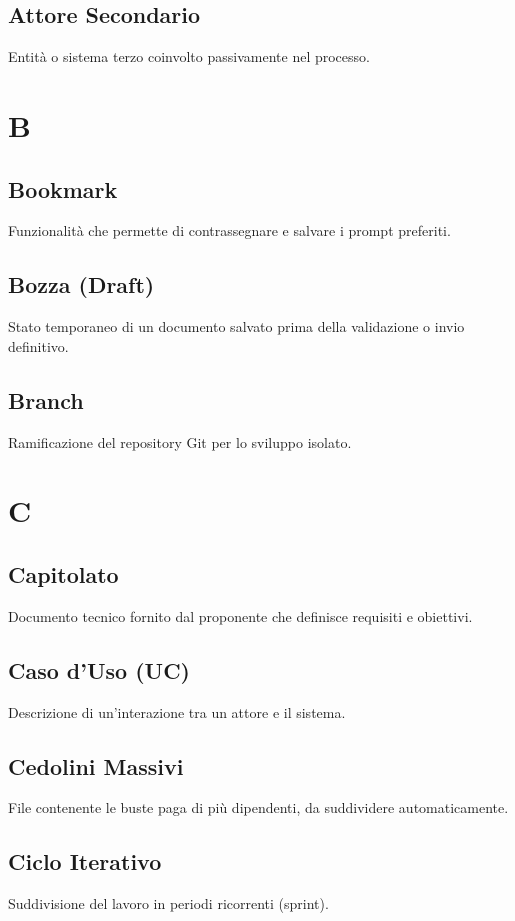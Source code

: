 \documentclass[a4paper,12pt]{article}
\begin{document}
\subsection{Attore Secondario}
Entità o sistema terzo coinvolto passivamente nel processo.

\section{B}
\subsection{Bookmark}
Funzionalità che permette di contrassegnare e salvare i prompt preferiti.

\subsection{Bozza (Draft)}
Stato temporaneo di un documento salvato prima della validazione o invio definitivo.

\subsection{Branch}
Ramificazione del repository Git per lo sviluppo isolato.


\section{C}
\subsection{Capitolato}
Documento tecnico fornito dal proponente che definisce requisiti e obiettivi.

\subsection{Caso d'Uso (UC)}
Descrizione di un'interazione tra un attore e il sistema.

\subsection{Cedolini Massivi}
File contenente le buste paga di più dipendenti, da suddividere automaticamente.

\subsection{Ciclo Iterativo}
Suddivisione del lavoro in periodi ricorrenti (sprint).
\end{document}
